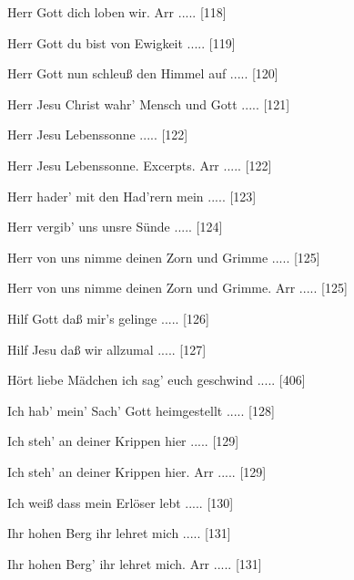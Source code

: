 \documentclass[twocolumn, 12pt]{book}
\begin{document}
\newline 
Herr Gott dich loben wir. Arr ..... [118]

\newline 
Herr Gott du bist von Ewigkeit ..... [119]

\newline 
Herr Gott nun schleuß den Himmel auf ..... [120]

\newline 
Herr Jesu Christ wahr' Mensch und Gott ..... [121]

\newline 
Herr Jesu Lebenssonne ..... [122]

\newline 
Herr Jesu Lebenssonne. Excerpts. Arr ..... [122]

\newline 
Herr hader' mit den Had'rern mein ..... [123]

\newline 
Herr vergib' uns unsre Sünde ..... [124]

\newline 
Herr von uns nimme deinen Zorn und Grimme ..... [125]

\newline 
Herr von uns nimme deinen Zorn und Grimme. Arr ..... [125]

\newline 
Hilf Gott daß mir's gelinge ..... [126]

\newline 
Hilf Jesu daß wir allzumal ..... [127]

\newline 
Hört liebe Mädchen ich sag' euch geschwind ..... [406]

\newline 
Ich hab' mein' Sach' Gott heimgestellt ..... [128]

\newline 
Ich steh' an deiner Krippen hier ..... [129]

\newline 
Ich steh' an deiner Krippen hier. Arr ..... [129]

\newline 
Ich weiß dass mein Erlöser lebt ..... [130]

\newline 
Ihr hohen Berg ihr lehret mich ..... [131]

\newline 
Ihr hohen Berg' ihr lehret mich. Arr ..... [131]
\end{document}
